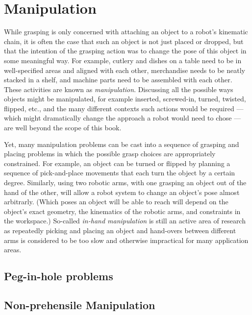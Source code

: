 \section{Manipulation}\label{sec:manipulation}
While grasping is only concerned with attaching an object to a robot's kinematic chain, it is often the case that such an object is not just placed or dropped, but that the intention of the grasping action was to change the pose of this object in some meaningful way. For example, cutlery and dishes on a table need to be in well-specified areas and aligned with each other, merchandise needs to be neatly stacked in a shelf, and machine parts need to be assembled with each other. These activities are known as \emph{manipulation}. Discussing all the possible ways objects might be manipulated, for example inserted, screwed-in, turned, twisted, flipped, etc., and the many different contexts such actions would be required --- which might dramatically change the approach a robot would need to chose --- are well beyond the scope of this book.

Yet, many manipulation problems can be cast into a sequence of grasping and placing problems in which the possible grasp choices are appropriately constrained. For example, an object can be turned or flipped by planning a sequence of pick-and-place movements that each turn the object by a certain degree. Similarly, using two robotic arms, with one grasping an object out of the hand of the other, will allow a robot system to change an object's pose almost arbitrarly. (Which poses an object will be able to reach will depend on the object's exact geometry, the kinematics of the robotic arms, and constraints in the workspace.) So-called \emph{in-hand manipulation} is still an active area of research as  repeatedly picking and placing an object and hand-overs between different arms is considered to be too slow and otherwise impractical for many application areas.  

\subsection{Peg-in-hole problems}
\subsection{Non-prehensile Manipulation}

